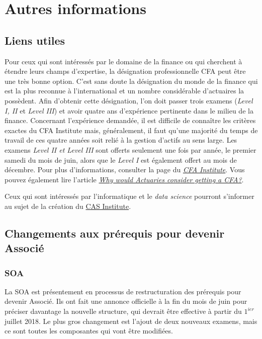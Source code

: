 \section*{Autres informations}
\label{sec:autres}

\subsection*{Liens utiles}
\label{subsec:liens}
Pour ceux qui sont intéressés par le domaine de la finance ou qui cherchent à étendre leurs champs d'expertise, la désignation professionnelle CFA peut être une très bonne option. C'est sans doute la désignation du monde de la finance qui est la plus reconnue à l'international et un nombre considérable d'actuaires la possèdent. Afin d'obtenir cette désignation, l'on doit passer trois examens (\emph{Level I, II} et \emph{Level III}) et avoir quatre ans d'expérience pertinente dans le milieu de la finance. Concernant l'expérience demandée, il est difficile de connaître les critères exactes du CFA Institute mais, généralement, il faut qu'une majorité du temps de travail de ces quatre années soit relié à la gestion d'actifs au sens large. Les examens \emph{Level II \emph{et} Level III} sont offerts seulement une fois par année, le premier samedi du mois de juin, alors que le \emph{Level I} est également offert au mois de décembre. Pour plus d'informations, consulter la page du \href{https://www.cfainstitute.org/Pages/index.aspx}{\emph{CFA Institute}}. Vous pouvez également lire l'article \href{http://blog.coachingactuaries.com/why-would-actuaries-consider-getting-a-cfa/}{\emph{Why would Actuaries consider getting a CFA?}}.\vspace{\baselineskip}

Ceux qui sont intéressés par l'informatique et le \emph{data science} pourront s'informer au sujet de la création du \href{http://www.casact.org/press/index.cfm?fa=viewArticle&articleID=3083}{CAS Institute}.\vspace{\baselineskip} 

\newpage
\subsection*{Changements aux prérequis pour devenir Associé}
\label{subsec:changeasa}
\subsubsection*{SOA}
La SOA est présentement en processus de restructuration des prérequis pour devenir Associé. Ils ont fait une annonce officielle à la fin du mois de juin pour préciser davantage la nouvelle structure, qui devrait être effective à partir du $1^{ier}$ juillet 2018. Le plus gros changement est l’ajout de deux nouveaux examens, mais ce sont toutes les composantes qui vont être modifiées.\vspace{\baselineskip} 

